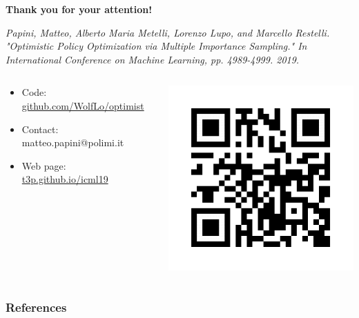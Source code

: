 \documentclass[aspectratio=169, table]{beamer}
\newcommand{\enb}[1]{\textcolor{poliblue1}{\textbf{#1}}}
\begin{document}
\begin{frame}[plain]
\begin{center}
	\huge{\enb{Thank you for your attention!}}
\end{center}
		\vspace{.5cm}
		\emph{Papini, Matteo, Alberto Maria Metelli, Lorenzo Lupo, and Marcello Restelli. "Optimistic Policy Optimization via Multiple Importance Sampling." In International Conference on Machine Learning, pp. 4989-4999. 2019.}
		\vspace{.5cm}
		\begin{columns}
			\begin{column}{.75\textwidth}
			\begin{itemize}
				\setlength{\itemsep}{20pt}
				\item[] Code: \url{github.com/WolfLo/optimist}
				\item[] Contact: matteo.papini@polimi.it
				\item[] Web page: \url{t3p.github.io/icml19} 
			\end{itemize}	
			\end{column}
			\begin{column}{.25\textwidth}
				\includegraphics[width=\textwidth]{qr.png} 
			\end{column}
		\end{columns}
\end{frame}


\begin{frame}
\frametitle{References}


\end{frame}

\end{document}

